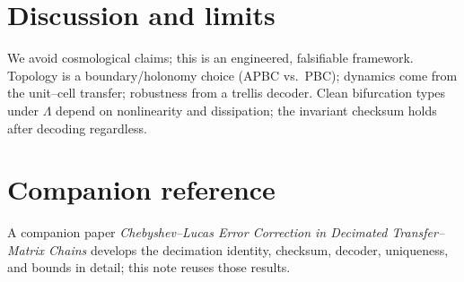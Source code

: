 \documentclass[11pt]{article}
\theoremstyle{definition}
\theoremstyle{remark}
\begin{document}
\section{Discussion and limits}
We avoid cosmological claims; this is an engineered, falsifiable framework.
Topology is a boundary/holonomy choice (APBC vs.\ PBC); dynamics come from the unit--cell transfer; robustness from a trellis decoder.
Clean bifurcation types under $\Lambda$ depend on nonlinearity and dissipation; the invariant checksum holds after decoding regardless.

\section*{Companion reference}
A companion paper \emph{Chebyshev--Lucas Error Correction in Decimated Transfer--Matrix Chains} develops the decimation identity,
checksum, decoder, uniqueness, and bounds in detail; this note reuses those results.
\end{document}
